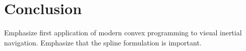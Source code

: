 
\section{Conclusion}

Emphasize first application of modern convex programming to visual inertial navigation. Emphasize that the spline formulation is important.
